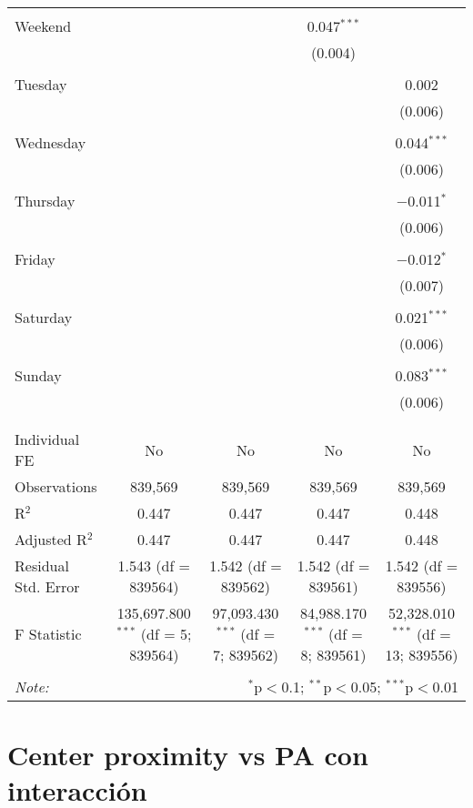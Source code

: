\documentclass[
]{article}
\begin{document}
\begin{table}[!htbp]
{\begin{tabular}{@{\extracolsep{5pt}}lcccc}
  & & & & \\ 
 Weekend &  &  & 0.047$^{***}$ &  \\ 
  &  &  & (0.004) &  \\ 
  & & & & \\ 
 Tuesday &  &  &  & 0.002 \\ 
  &  &  &  & (0.006) \\ 
  & & & & \\ 
 Wednesday &  &  &  & 0.044$^{***}$ \\ 
  &  &  &  & (0.006) \\ 
  & & & & \\ 
 Thursday &  &  &  & $-$0.011$^{*}$ \\ 
  &  &  &  & (0.006) \\ 
  & & & & \\ 
 Friday &  &  &  & $-$0.012$^{*}$ \\ 
  &  &  &  & (0.007) \\ 
  & & & & \\ 
 Saturday &  &  &  & 0.021$^{***}$ \\ 
  &  &  &  & (0.006) \\ 
  & & & & \\ 
 Sunday &  &  &  & 0.083$^{***}$ \\ 
  &  &  &  & (0.006) \\ 
  & & & & \\ 
\hline \\[-1.8ex] 
Individual FE & No & No & No & No \\ 
Observations & 839,569 & 839,569 & 839,569 & 839,569 \\ 
R$^{2}$ & 0.447 & 0.447 & 0.447 & 0.448 \\ 
Adjusted R$^{2}$ & 0.447 & 0.447 & 0.447 & 0.448 \\ 
Residual Std. Error & 1.543 (df = 839564) & 1.542 (df = 839562) & 1.542 (df = 839561) & 1.542 (df = 839556) \\ 
F Statistic & 135,697.800$^{***}$ (df = 5; 839564) & 97,093.430$^{***}$ (df = 7; 839562) & 84,988.170$^{***}$ (df = 8; 839561) & 52,328.010$^{***}$ (df = 13; 839556) \\ 
\hline 
\hline \\[-1.8ex] 
\textit{Note:}  & \multicolumn{4}{r}{$^{*}$p$<$0.1; $^{**}$p$<$0.05; $^{***}$p$<$0.01} \\ 
\end{tabular}
} 
\end{table} 
\newpage
\section{Center proximity vs PA con interacción}
\end{document}
